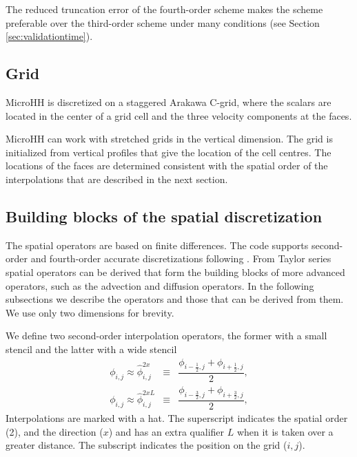 \documentclass[gmd]{copernicus}
\begin{document}
The reduced truncation error of the fourth-order scheme makes the scheme preferable over the third-order scheme under many conditions (see Section \ref{sec:validationtime}).

\subsection{Grid}
MicroHH is discretized on a staggered Arakawa C-grid, where the scalars are located in the center of a grid cell and the three velocity components at the faces.

MicroHH can work with stretched grids in the vertical dimension. The grid is initialized from vertical profiles that give the location of the cell centres. The locations of the faces are determined consistent with the spatial order of the interpolations that are described in the next section.

\subsection{Building blocks of the spatial discretization}
The spatial operators are based on finite differences. The code supports second-order and fourth-order accurate discretizations following \citet{Morinishi1998, Vasilyev2000}. From Taylor series spatial operators can be derived that form the building blocks of more advanced operators, such as the advection and diffusion operators. In the following subsections we describe the operators and those that can be derived from them. We use only two dimensions for brevity.

We define two second-order interpolation operators, the former with a small stencil and the latter with a wide stencil
\begin{eqnarray}
\phi_{i,j} \approx \widehat{\phi}^{2x }_{i,j} & \equiv & \dfrac{\phi_{i-\frac{1}{2},j} + \phi_{i+\frac{1}{2},j}}{2},\\
\phi_{i,j} \approx \widehat{\phi}^{2xL}_{i,j} & \equiv & \dfrac{\phi_{i-\frac{3}{2},j} + \phi_{i+\frac{3}{2},j}}{2},
\end{eqnarray}
Interpolations are marked with a hat. The superscript indicates the spatial order (2), and the direction ($x$) and has an extra qualifier $L$ when it is taken over a greater distance. The subscript indicates the position on the grid ($i,j$).
\end{document}
